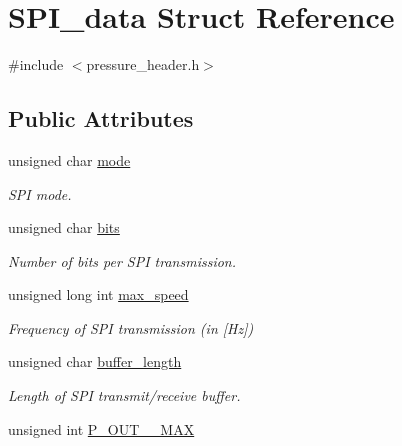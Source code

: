 \hypertarget{structSPI__data}{\section{S\-P\-I\-\_\-data Struct Reference}
\label{structSPI__data}
}


{\ttfamily \#include $<$pressure\-\_\-header.\-h$>$}

\subsection*{Public Attributes}
\begin{DoxyCompactItemize}
\item 
\hypertarget{structSPI__data_aaf787f81751e9d18950132ae7d9a8da4}{unsigned char \hyperlink{structSPI__data_aaf787f81751e9d18950132ae7d9a8da4}{mode}}\label{structSPI__data_aaf787f81751e9d18950132ae7d9a8da4}

\begin{DoxyCompactList}\small\item\em S\-P\-I mode. \end{DoxyCompactList}\item 
\hypertarget{structSPI__data_a753df088a8164dcd9b1cacda6127da39}{unsigned char \hyperlink{structSPI__data_a753df088a8164dcd9b1cacda6127da39}{bits}}\label{structSPI__data_a753df088a8164dcd9b1cacda6127da39}

\begin{DoxyCompactList}\small\item\em Number of bits per S\-P\-I transmission. \end{DoxyCompactList}\item 
\hypertarget{structSPI__data_a5a97f7a0be149b0eea43de02bb9f5538}{unsigned long int \hyperlink{structSPI__data_a5a97f7a0be149b0eea43de02bb9f5538}{max\-\_\-speed}}\label{structSPI__data_a5a97f7a0be149b0eea43de02bb9f5538}

\begin{DoxyCompactList}\small\item\em Frequency of S\-P\-I transmission (in \mbox{[}Hz\mbox{]}) \end{DoxyCompactList}\item 
\hypertarget{structSPI__data_a30db968277621df77b6ba5171c79da08}{unsigned char \hyperlink{structSPI__data_a30db968277621df77b6ba5171c79da08}{buffer\-\_\-length}}\label{structSPI__data_a30db968277621df77b6ba5171c79da08}

\begin{DoxyCompactList}\small\item\em Length of S\-P\-I transmit/receive buffer. \end{DoxyCompactList}\item 
\hypertarget{structSPI__data_ab122e183f5f46e7984e7f581fa980ffe}{unsigned int \hyperlink{structSPI__data_ab122e183f5f46e7984e7f581fa980ffe}{P\-\_\-\-O\-U\-T\-\_\-\-\_\-\-M\-A\-X}}\label{structSPI__data_ab122e183f5f46e7984e7f581fa980ffe}


\end{DoxyCompactItemize}
